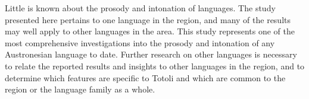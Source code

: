 Little is known about the prosody and intonation of  languages. The study presented here pertains to one language in the region, and many of the results may well apply to other languages in the area. This study represents one of the most comprehensive investigations into the prosody and intonation of any Austronesian language to date. Further research on other languages is necessary to relate the reported results and insights to other languages in the region, and to determine which features are specific to Totoli and which are common to the region or the language family as a whole.



